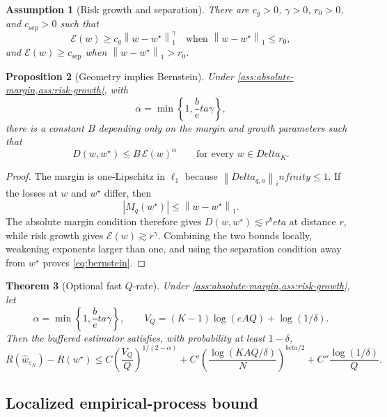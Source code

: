 \documentclass[11pt]{article}
\def\beta{beta}%
\def\infty{infinity}%
\def\Delta{Delta}%
\newtheorem{theorem}{Theorem}[section]
\newtheorem{proposition}[theorem]{Proposition}
\newtheorem{assumption}[theorem]{Assumption}
\newcommand{\eps}{\varepsilon}
\newcommand{\abs}[1]{\left|#1\right|}
\newcommand{\norm}[1]{\left\lVert#1\right\rVert}
\begin{document}
\begin{assumption}[Risk growth and separation]
\label{ass:risk-growth}
There are $c_g>0$, $\gamma>0$, $r_0>0$, and $c_{\mathrm{sep}}>0$ such that
\[
\mathcal E(w)
\ge
c_g\norm{w-w^\star}_1^\gamma
\quad\text{when }\norm{w-w^\star}_1\le r_0,
\]
and $\mathcal E(w)\ge c_{\mathrm{sep}}$ when $\norm{w-w^\star}_1>r_0$.
\end{assumption}

\begin{proposition}[Geometry implies Bernstein]
\label{prop:geometry-bernstein}
Under \cref{ass:absolute-margin,ass:risk-growth}, with
\[
\alpha=\min\left\{1,\frac\beta\gamma\right\},
\]
there is a constant $B$ depending only on the margin and growth parameters such that
\begin{equation}
\label{eq:bernstein}
D(w,w^\star)
\le
B\,\mathcal E(w)^\alpha
\qquad\text{for every }w\in\Delta_K.
\end{equation}
\end{proposition}

\begin{proof}
The margin is one-Lipschitz in $\ell_1$ because $\norm{\Delta_{q,a}}_\infty\le1$.  If the losses at $w$ and $w^\star$ differ, then
\[
\abs{M_q(w^\star)}
\le
\norm{w-w^\star}_1.
\]
The absolute margin condition therefore gives $D(w,w^\star)\lesssim r^\beta$ at distance $r$, while risk growth gives $\mathcal E(w)\gtrsim r^\gamma$.  Combining the two bounds locally, weakening exponents larger than one, and using the separation condition away from $w^\star$ proves \eqref{eq:bernstein}.
\end{proof}

\begin{theorem}[Optional fast $Q$-rate]
\label{thm:fastQ}
Under \cref{ass:absolute-margin,ass:risk-growth}, let
\[
\alpha=\min\left\{1,\frac\beta\gamma\right\},
\qquad
V_Q=(K-1)\log(eAQ)+\log(1/\delta).
\]
Then the buffered estimator satisfies, with probability at least $1-\delta$,
\begin{equation}
\label{eq:fastQ}
R(\widehat w_{\eps_N})-R(w^\star)
\le
C\left(\frac{V_Q}{Q}\right)^{1/(2-\alpha)}
+C'\left(\frac{\log(KAQ/\delta)}{N}\right)^{\beta/2}
+C''\frac{\log(1/\delta)}{Q}.
\end{equation}
\end{theorem}

\subsection{Localized empirical-process bound}
\end{document}
